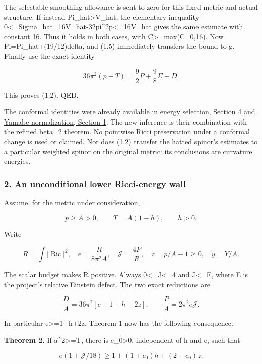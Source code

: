 \documentclass[
  10pt,
]{article}
\begin{document}
The selectable smoothing allowance is sent to zero for this fixed metric
and actual structure. If instead Pi\_hat\textgreater V\_hat, the
elementary inequality
0\textless=Sigma\_hat=16V\_hat-32pi\^{}2p\textless=16V\_hat gives the
same estimate with constant 16. Thus it holds in both cases, with
C\textgreater=max(C\_0,16). Now Pi=Pi\_hat+(19/12)delta, and (1.5)
immediately transfers the bound to g. Finally use the exact identity

\[
 36\pi^2(p-T)=\frac92P+\frac98\Sigma-D.                 \tag{1.6}
\]

This proves (1.2). QED.

The conformal identities were already available in
\href{../mathematics/current/line1_energy_selection.md}{energy
selection, Section 4} and
\href{../mathematics/current/line1_yamabe_endpoint.md}{Yamabe
normalization, Section 1}. The new inference is their combination with
the refined beta=2 theorem. No pointwise Ricci preservation under a
conformal change is used or claimed. Nor does (1.2) transfer the hatted
spinor's estimates to a particular weighted spinor on the original
metric: its conclusions are curvature energies.

\hypertarget{an-unconditional-lower-ricci-energy-wall}{%
\subsubsection{2. An unconditional lower Ricci-energy
wall}\label{an-unconditional-lower-ricci-energy-wall}}

Assume, for the metric under consideration,

\[
 p\ge A>0,\qquad T=A(1-h),\qquad h>0.
\]

Write

\[
 R=\int|\operatorname{Ric}|^2,\quad
 e=\frac{R}{8\pi^2A},\quad
 \mathcal J=\frac{4P}{R},\quad z=p/A-1\ge0,\quad y=Y/A.
\]

The scalar budget makes R positive. Always 0\textless=J\textless=4 and
J\textless=E, where E is the project's relative Einstein defect. The two
exact reductions are

\[
 \frac DA=36\pi^2[e-1-h-2z],\qquad
 \frac PA=2\pi^2e\mathcal J.                           \tag{2.1}
\]

In particular e\textgreater=1+h+2z. Theorem 1 now has the following
consequence.

\textbf{Theorem 2.} If a\^{}2\textgreater=T, there is c\_0\textgreater0,
independent of h and e, such that

\[
 \boxed{e(1+\mathcal J/18)
       \ge1+(1+c_0)h+(2+c_0)z.}                       \tag{2.2}
\]
\end{document}
